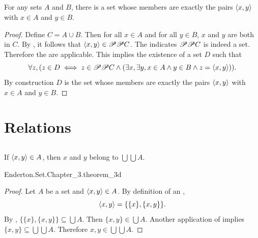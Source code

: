 \documentclass{report}
\begin{document}
\subsection{}%

  \begin{theorem}[3C]
    For any sets $A$ and $B$, there is a set whose members are exactly the
      pairs $\left< x, y \right>$ with $x \in A$ and $y \in B$.
  \end{theorem}


  \begin{proof}
    Define $C = A \cup B$.
    Then for all $x \in A$ and for all $y \in B$, $x$ and $y$ are both in $C$.
    By , it follows that
      $\left< x, y \right> \in \mathscr{P}\mathscr{P}C$.
    The  indicates $\mathscr{P}\mathscr{P}C$ is
      indeed a set.
    Therefore the  are applicable.
    This implies the existence of a set $D$ such that
      $$\forall z, (z \in D \iff z \in \mathscr{P}\mathscr{P}C \land
        (\exists x, \exists y, x \in A \land y \in B \land
          z = \left< x, y \right>)).$$
    By construction $D$ is the set whose members are exactly the pairs
      $\left< x, y \right>$ with $x \in A$ and $y \in B$.
  \end{proof}

\section{Relations}%

\subsection{}%

  \begin{theorem}[3D]
    If $\left< x, y \right> \in A$, then $x$ and $y$ belong to $\bigcup\bigcup A$.
  \end{theorem}

    {Enderton.Set.Chapter\_3.theorem\_3d}

  \begin{proof}
    Let $A$ be a set and $\left< x, y \right> \in A$.
    By definition of an ,
      $$\left< x, y \right> = \{\{x\}, \{x, y\}\}.$$
    By , $\{\{x\}, \{x, y\}\} \subseteq \bigcup A$.
    Then $\{x, y\} \in \bigcup A$.
    Another application of  implies
      $\{x, y\} \subseteq \bigcup\bigcup A$.
    Therefore $x, y \in \bigcup\bigcup A$.
  \end{proof}
\end{document}
